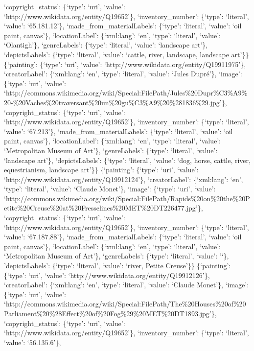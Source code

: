 \documentclass[
  letterpaper,
  DIV=11,
  numbers=noendperiod]{scrreprt}
\begin{document}
`copyright\_status': \{`type': `uri', `value':
`http://www.wikidata.org/entity/Q19652'\}, `inventory\_number':
\{`type': `literal', `value': `65.181.12'\},
`made\_from\_materialLabels': \{`type': `literal', `value': `oil paint,
canvas'\}, `locationLabel': \{`xml:lang': `en', `type': `literal',
`value': `Olantigh'\}, `genreLabels': \{`type': `literal', `value':
`landscape art'\}, `depictsLabels': \{`type': `literal', `value':
`cattle, river, landscape, landscape art'\}\} \{`painting': \{`type':
`uri', `value': `http://www.wikidata.org/entity/Q19911975'\},
`creatorLabel': \{`xml:lang': `en', `type': `literal', `value': `Jules
Dupré'\}, `image': \{`type': `uri', `value':
`http://commons.wikimedia.org/wiki/Special:FilePath/Jules\%20Dupr\%C3\%A9\%20-\%20Vaches\%20traversant\%20un\%20gu\%C3\%A9\%20\%281836\%29.jpg'\},
`copyright\_status': \{`type': `uri', `value':
`http://www.wikidata.org/entity/Q19652'\}, `inventory\_number':
\{`type': `literal', `value': `67.213'\}, `made\_from\_materialLabels':
\{`type': `literal', `value': `oil paint, canvas'\}, `locationLabel':
\{`xml:lang': `en', `type': `literal', `value': `Metropolitan Museum of
Art'\}, `genreLabels': \{`type': `literal', `value': `landscape art'\},
`depictsLabels': \{`type': `literal', `value': `dog, horse, cattle,
river, equestrianism, landscape art'\}\} \{`painting': \{`type': `uri',
`value': `http://www.wikidata.org/entity/Q19912124'\}, `creatorLabel':
\{`xml:lang': `en', `type': `literal', `value': `Claude Monet'\},
`image': \{`type': `uri', `value':
`http://commons.wikimedia.org/wiki/Special:FilePath/Rapids\%20on\%20the\%20Petite\%20Creuse\%20at\%20Fresselines\%20MET\%20DT226477.jpg'\},
`copyright\_status': \{`type': `uri', `value':
`http://www.wikidata.org/entity/Q19652'\}, `inventory\_number':
\{`type': `literal', `value': `67.187.88'\},
`made\_from\_materialLabels': \{`type': `literal', `value': `oil paint,
canvas'\}, `locationLabel': \{`xml:lang': `en', `type': `literal',
`value': `Metropolitan Museum of Art'\}, `genreLabels': \{`type':
`literal', `value': '`\}, 'depictsLabels': \{`type': `literal', `value':
`river, Petite Creuse'\}\} \{`painting': \{`type': `uri', `value':
`http://www.wikidata.org/entity/Q19912126'\}, `creatorLabel':
\{`xml:lang': `en', `type': `literal', `value': `Claude Monet'\},
`image': \{`type': `uri', `value':
`http://commons.wikimedia.org/wiki/Special:FilePath/The\%20Houses\%20of\%20Parliament\%20\%28Effect\%20of\%20Fog\%29\%20MET\%20DT1893.jpg'\},
`copyright\_status': \{`type': `uri', `value':
`http://www.wikidata.org/entity/Q19652'\}, `inventory\_number':
\{`type': `literal', `value': `56.135.6'\},
\end{document}

